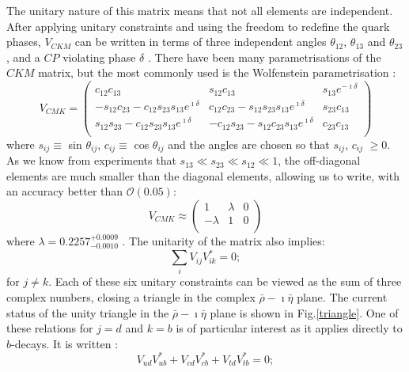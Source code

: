 \documentclass[a4paper,12pt]{article}
\begin{document}
The unitary nature of this matrix means that not all elements are independent. After applying unitary constraints and using the freedom to redefine the quark phases, $V_{CKM}$ can be written in terms of three independent angles $\theta_{12}$,  $\theta_{13}$ and $\theta_{23}$, and a $CP$ violating phase $\delta$ \cite{altarelli}. There have been many parametrisations of the $CKM$ matrix, but the most commonly used is the Wolfenstein parametrisation \cite{wolfenstein}:\color{black} 
\begin{equation}
V_{CMK} = \begin{pmatrix}c_{12} c_{13} & s_{12}c_{13} & s_{13} e^{-\imath\delta}\\
                                            -s_{12}c_{23} - c_{12}s_{23}s_{13}e^{\imath\delta} & c_{12}c_{23} - s_{12}s_{23}s_{13}e^{\imath\delta} & s_{23}c_{13} \\
s_{12}s_{23} - c_{12}s_{23}s_{13}e^{\imath\delta} & -c_{12}s_{23} - s_{12}c_{23}s_{13}e^{\imath\delta} & c_{23}c_{13} \\
\end{pmatrix}
\end{equation}
where $s_{ij}\equiv$ sin $\theta_{ij}$, $c_{ij}\equiv$ cos $\theta_{ij}$ and the angles are chosen so that $s_{ij}$, $c_{ij}$ $\geq 0$.  
As we know from experiments that $s_{13} \ll s_{23}\ll s_{12}\ll 1$, the off-diagonal elements are much smaller than the diagonal elements, allowing us to write, with an accuracy better than $\mathcal O (0.05)$:
\begin{equation}
V_{CMK} \approx \begin{pmatrix} 1&\lambda&0\\
-\lambda&1&0\\
\end{pmatrix}
\end{equation}
where $\lambda = 0.2257^{+0.0009}_{-0.0010}$ \cite[p. 19]{paper1}. 
The unitarity of the matrix also implies: 
\begin{equation}
\sum_i V_{ij} V_{ik}^*=0;
\end{equation}
for $j\neq k$. Each of these six unitary constraints can be viewed as the sum of three complex numbers, closing a triangle in the complex $\bar\rho - \imath\bar\eta$ plane. The current status of the unity triangle in the $\bar\rho - \imath\bar\eta$ plane is shown in Fig.\ref{triangle}. One of these relations for $j=d$ and $k=b$ is of particular interest as it applies directly to $b$-decays. It is written \cite[p. 308]{altarelli}: 
\begin{equation}
V_{ud}V_{ub}^{\ast} + V_{cd}V_{cb}^{\ast} +  V_{td}V_{tb}^{\ast}=0;
\end{equation}
\end{document}
